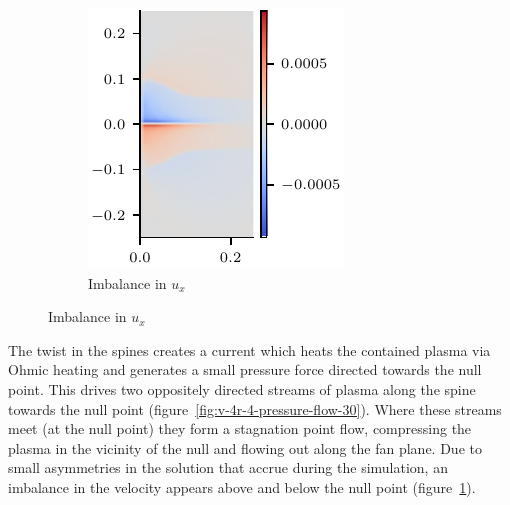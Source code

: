 \begin{figure}[t]
\begin{subfigure}{0.32\textwidth}
      \includegraphics[width=\linewidth]{v-4r-4-vx-imbalance-30.pdf}
      \caption{Imbalance in $u_x$}
      \label{fig:v-4r-4-vx-imbalance-30}
    \end{subfigure}

\label{fig:imbalance_in_velocity}
\end{figure}

The twist in the spines creates a current which heats the contained plasma via Ohmic heating and generates a small pressure force directed towards the null point. This drives two oppositely directed streams of plasma along the spine towards the null point (figure~\ref{fig:v-4r-4-pressure-flow-30}). Where these streams meet (at the null point) they form a stagnation point flow, compressing the plasma in the vicinity of the null and flowing out along the fan plane. Due to small asymmetries in the solution that accrue during the simulation, an imbalance in the velocity appears above and below the null point (figure~\ref{fig:v-4r-4-vx-imbalance-30}). 

